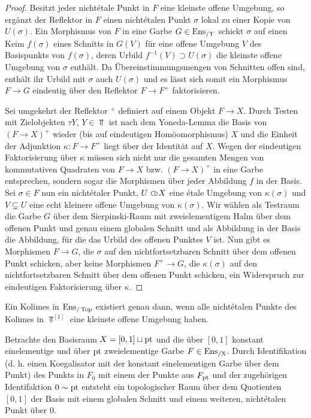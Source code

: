 \begin{proof}
  Besitzt jeder nichtétale Punkt in $F$ eine kleinste offene Umgebung,
  so ergänzt der Reflektor in $F$ einen nichtétalen Punkt $\sigma$
  lokal zu einer Kopie von $U(\sigma)$. Ein Morphismus von $F$ in eine
  Garbe $G \in \operatorname{Ens}_{/Y}$ schickt $\sigma$ auf einen Keim $f(\sigma)$
  eines Schnitts in $G(V)$ für eine offene Umgebung $V$ des
  Basispunkts von $f(\sigma)$, deren Urbild $f^{-1}(V) \supset
  U(\sigma)$ die kleinste offene Umgebung von $\sigma$ enthält. Da
  Übereinstimmungsmengen von Schnitten offen sind, enthält ihr Urbild
  mit $\sigma$ auch $U(\sigma)$ und es lässt sich somit ein Morphismus
  $F \to G$ eindeutig über den Reflektor $F \to F^+$ faktorisieren.
  
  Sei umgekehrt der Reflektor $^+$ definiert auf einem Objekt $F \to
  X$. Durch Testen mit Zielobjekten $\tau Y$, $Y \in \Top$ ist nach
  dem Yoneda-Lemma die Basis von $(F \to X)^+$ wieder (bis auf
  eindeutigen Homöomorphismus) $X$ und die Einheit der Adjunktion
  $\kappa: F \to F^+$ liegt über der Identität auf $X$. Wegen der
  eindeutigen Faktorisierung über $\kappa$ müssen sich nicht nur die
  gesamten Mengen von kommutativen Quadraten von $F \to X$ bzw. $(F
  \to X)^+$ in eine Garbe entsprechen, sondern sogar die Morphismen
  über jeder Abbildung $f$ in der Basis. Sei $\sigma \in F$ nun ein
  nichtétaler Punkt, $U \subset\kern-0.58em\circ X$ eine étale Umgebung von
  $\kappa(\sigma)$ und $V \subsetneq U$ eine echt kleinere offene
  Umgebung von $\kappa(\sigma)$. Wir wählen als Testraum die Garbe $G$
  über dem Sierpinski-Raum mit zweielementigem Halm über dem offenen
  Punkt und genau einem globalen Schnitt und als Abbildung in der
  Basis die Abbildung, für die das Urbild des offenen Punktes $V$
  ist. Nun gibt es Morphismen $F \to G$, die $\sigma$ auf den
  nichtfortsetzbaren Schnitt über dem offenen Punkt schicken, aber
  keine Morphismen $F^+ \to G$, die $\kappa(\sigma)$ auf den
  nichtfortsetzbaren Schnitt über dem offenen Punkt schicken, ein
  Widerspruch zur eindeutigen Faktorisierung über $\kappa$.
\end{proof}
\begin{kor} \label{enstop-coequalizers}
  Ein Kolimes in $\operatorname{Ens}_{/\operatorname{Top}}$ existiert genau dann, wenn alle nicht\-étalen
  Punkte des Kolimes in $\Top^{[1]}$ eine kleinste offene Umgebung
  haben.
\end{kor}
\begin{bsp}
  Betrachte den Basisraum $X = [0, 1] \sqcup \operatorname{pt}$ und die über $[0,
    1]$ konstant einelementige und über $\operatorname{pt}$ zweielementige Garbe
  $F \in \operatorname{Ens_{/X}}$. Durch Identifikation (d. h. einen Koegalisator mit
  der konstant einelementigen Garbe über dem Punkt) des Punkts in
  $F_0$ mit einem der Punkte aus $F_{\operatorname{pt}}$ und der zugehörigen
  Identifaktion $0 \sim \operatorname{pt}$ entsteht ein topologischer Raum über
  dem Quotienten $[0, 1]$ der Basis mit einem globalen Schnitt und
  einem weiteren, nichtétalen Punkt über $0$.
\end{bsp}



